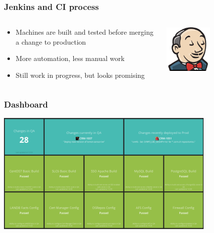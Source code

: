\documentclass[aspectratio=169]{beamer}
\begin{document}
\begin{frame}
    \frametitle{Jenkins and CI process}
    \begin{minipage}[T]{0.95\textwidth}
        \begin{columns}
            \begin{column}{0.5\textwidth}
                \begin{itemize}
                    \item Machines are built and tested before merging a change to production
                    \item More automation, less manual work
                    \item Still work in progress, but looks promising
                \end{itemize}
            \end{column}
            \begin{column}{0.5\textwidth}
                \begin{center}
                    \includegraphics[width=0.5\textwidth]{Jenkins_headshot.png}
                \end{center}
            \end{column}
        \end{columns}
    \end{minipage}
\end{frame}


\begin{frame}
    \frametitle{Dashboard}
        \begin{center}
            \includegraphics[width=0.8\textwidth]{CI-dashboard.png}
        \end{center}
\end{frame}
\end{document}
